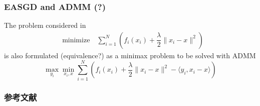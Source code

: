 
\begin{frame}
\frametitle{EASGD and ADMM (?)}

The problem considered in \cite{zhang2015easgd}
\begin{align*}
    & \text{minimize} \quad \sum\limits_{i=1}^N \left( f_i(x_i) + \dfrac{\lambda}{2} \lVert x_i - x \rVert^2 \right)
\end{align*}
is also formulated (equivalence?) as a minimax problem to be solved with ADMM
$$\max_{y_i}\min_{x_i,x} \sum_{i=1}^N \left( f_i(x_i) + \dfrac{\lambda}{2} \lVert x_i - x \rVert^2 - \langle y_i, x_i-x \rangle \right)$$

\end{frame}


\begin{frame}[allowframebreaks]
\frametitle{参考文献}

{\footnotesize


}

\end{frame}


